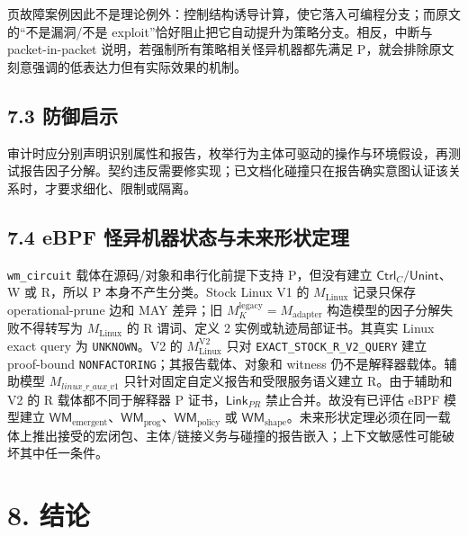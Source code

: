 \documentclass[
  11pt,
  a4paper,
]{ctexart}
\begin{document}
页故障案例因此不是理论例外：控制结构诱导计算，使它落入可编程分支；而原文的``不是漏洞/不是
exploit''恰好阻止把它自动提升为策略分支。相反，中断与 packet-in-packet
说明，若强制所有策略相关怪异机器都先满足
P，就会排除原文刻意强调的低表达力但有实际效果的机制。

\hypertarget{73-ux9632ux5fa1ux542fux793a}{%
\subsection{7.3 防御启示}\label{73-ux9632ux5fa1ux542fux793a}}

审计时应分别声明识别属性和报告，枚举行为主体可驱动的操作与环境假设，再测试报告因子分解。契约违反需要修实现；已文档化碰撞只在报告确实意图认证该关系时，才要求细化、限制或隔离。

\hypertarget{74-ebpf-ux602aux5f02ux673aux5668ux72b6ux6001ux4e0eux672aux6765ux5f62ux72b6ux5b9aux7406}{%
\subsection{7.4 eBPF
怪异机器状态与未来形状定理}\label{74-ebpf-ux602aux5f02ux673aux5668ux72b6ux6001ux4e0eux672aux6765ux5f62ux72b6ux5b9aux7406}}

\texttt{wm\_circuit} 载体在源码/对象和串行化前提下支持 P，但没有建立
\(\mathsf{Ctrl}_C/\mathsf{Unint}\)、W 或 R，所以 P 本身不产生分类。Stock
Linux V1 的 \(M_{\mathrm{Linux}}\) 记录只保存 operational-prune 边和 MAY
差异；旧 \(M_K^{\mathrm{legacy}}=M_{\mathrm{adapter}}\)
构造模型的因子分解失败不得转写为 \(M_{\mathrm{Linux}}\) 的 R 谓词、定义
2 实例或轨迹局部证书。其真实 Linux exact query 为 \texttt{UNKNOWN}。V2
的 \(M_{\mathrm{Linux}}^{\mathrm{V2}}\) 只对
\texttt{EXACT\_STOCK\_R\_V2\_QUERY} 建立 proof-bound
\texttt{NONFACTORING}；其报告载体、对象和 witness
仍不是解释器载体。辅助模型 \(M_{\mathit{linux\_r\_aux\_v1}}\)
只针对固定自定义报告和受限服务语义建立 R。由于辅助和 V2 的 R
载体都不同于解释器 P 证书，\(\mathsf{Link}_{PR}\) 禁止合并。故没有已评估
eBPF 模型建立
\(\mathsf{WM}_{\mathrm{emergent}}\)、\(\mathsf{WM}_{\mathrm{prog}}\)、\(\mathsf{WM}_{\mathrm{policy}}\)
或
\(\mathsf{WM}_{\mathrm{shape}}\)。未来形状定理必须在同一载体上推出接受的宏闭包、主体/链接义务与碰撞的报告嵌入；上下文敏感性可能破坏其中任一条件。

\hypertarget{8-ux7ed3ux8bba}{%
\section{8. 结论}\label{8-ux7ed3ux8bba}}
\end{document}
